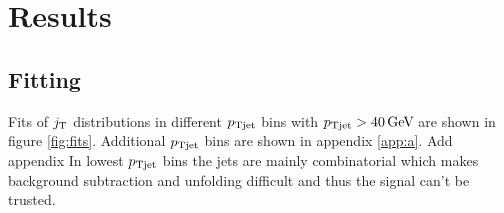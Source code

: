 \FloatBarrier
\section{Results}
\label{sec:results}



%









\subsection{Fitting}
Fits of $j_{\rm T}$ distributions in different $p_{\rm Tjet}$ bins with $\pt{jet}  > \unit[40]{\gev}$ are shown in figure \ref{fig:fits}. Additional $p_{\rm Tjet}$ bins are shown in appendix \ref{app:a}. {\color{red} Add appendix} In lowest $p_{\rm Tjet}$ bins the jets are mainly combinatorial which makes background subtraction and unfolding difficult and thus the signal can't be trusted. 

